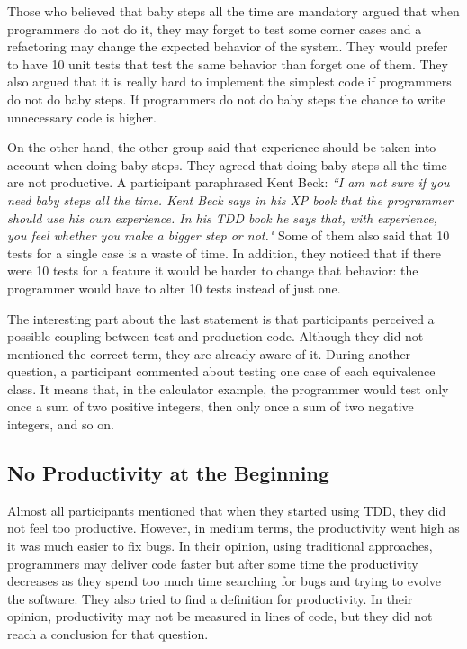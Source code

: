 Those who believed that baby steps all the time are mandatory argued that when
programmers do not do it, they may forget to test some corner cases and a
refactoring may change the expected behavior of the system.
They would prefer to have 10 unit tests that test the same behavior than forget
one of them.
They also argued that it is really hard to implement the simplest code if
programmers do not do baby steps. If programmers do not do baby steps the chance
to write unnecessary code is higher.

On the other hand, the other group said that experience should be taken into
account when doing baby steps.
They agreed that doing baby steps all the time are not productive. A participant
paraphrased Kent Beck: \textit{``I am not sure if you need baby steps all the
time. Kent Beck says in his XP book that the programmer should use his own
experience. In his TDD book he says that, with experience, you feel whether you
make a bigger step or not."}
Some of them also said that 10 tests for a single case is a waste of time. In
addition, they noticed that if there were 10 tests for a feature it would be
harder to change that behavior: the programmer would have to alter 10 tests
instead of just one.

The interesting part about the last statement is that participants perceived a
possible coupling between test and production code. Although they did not
mentioned the correct term, they are already aware of it.
During another question, a participant commented about testing one case of each
equivalence class. It means that, in the calculator example, the programmer
would test only once a sum of two positive integers, then only once a sum of two
negative integers, and so on.

\subsection{No Productivity at the Beginning}

Almost all participants mentioned that when they started using TDD, they did not
feel too productive. However, in medium terms, the productivity went high as it
was much easier to fix bugs. In their opinion, using traditional approaches,
programmers may deliver code faster but after some time the productivity
decreases as they spend too much time searching for bugs and trying to evolve
the software.
They also tried to find a definition for productivity. In their opinion,
productivity may not be measured in lines of code, but they did not reach a
conclusion for that question.


